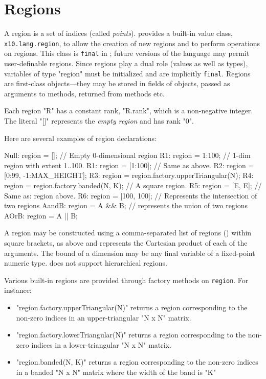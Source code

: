 \section{Regions}\label{XtenRegions}

A region is a set of indices (called {\em points}).  {}\Xten{}
provides a built-in value class, {\tt x10.lang.region}, to allow the
creation of new regions and to perform operations on regions. This
class is {\tt final} in {}\XtenCurrVer; future versions of the
language may permit user-definable regions. Since regions play a dual
role (values as well as types), variables of type \xcd"region" must be
initialized and are implicitly {\tt final}. Regions are first-class
objects---they may be stored in fields of objects, passed as
arguments to methods, returned from methods etc.

Each region \xcd"R" has a constant rank, \xcd"R.rank", which is a
non-negative integer. The literal \xcd"[]" represents the {\em empty
region} and has rank \xcd"0".

Here are several examples of region declarations:
\begin{xten}
Null: region = [];  // Empty 0-dimensional region          
R1: region = 1:100; // 1-dim region with extent 1..100.
R1: region = [1:100]; // Same as above.
R2: region = [0:99, -1:MAX_HEIGHT];   
R3: region = region.factory.upperTriangular(N);
R4: region = region.factory.banded(N, K);
   // A square region.
R5: region = [E, E];           
   // Same as: region above.
R6: region = [100, 100];       
   // Represents the intersection of two regions
AandB: region = A && B;       
  // represents the union of two regions
AOrB: region = A || B;        
\end{xten}

A region may be constructed using a comma-separated list of regions
() within square brackets, as above and represents
the Cartesian product of each of the arguments.  The bound of a
dimension may be any final variable of a fixed-point numeric
type. \XtenCurrVer{} does not support hierarchical regions.

Various built-in regions are provided through  factory
methods on {\tt region}.  For instance:
\begin{itemize}
{}\item \xcd"region.factory.upperTriangular(N)" returns a region corresponding
to the non-zero indices in an upper-triangular \xcd"N x N" matrix.
{}\item \xcd"region.factory.lowerTriangular(N)" returns a region corresponding
to the non-zero indices in a lower-triangular \xcd"N x N" matrix.
{}\item \xcd"region.banded(N, K)" returns a region corresponding to
the non-zero indices in a banded \xcd"N x N" matrix where the width of
the band is \xcd"K"
\end{itemize}

